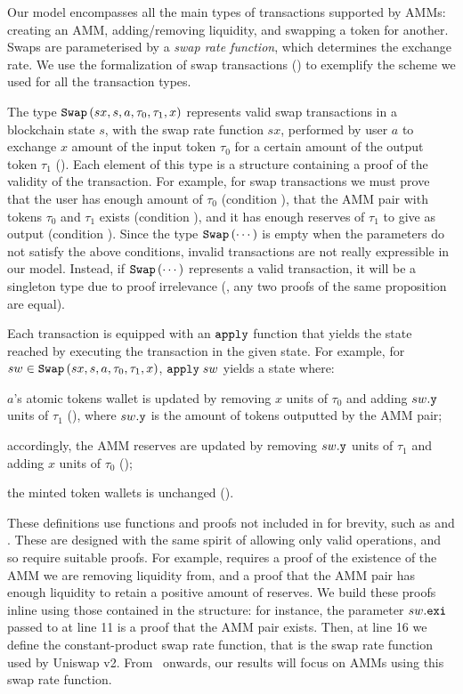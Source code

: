 Our model encompasses all the main types of transactions supported by AMMs: creating an AMM, adding/removing liquidity, and swapping a token for another. 
Swaps are parameterised by a \emph{swap rate function}, which determines the  exchange rate.
We use the formalization of swap transactions () to exemplify the scheme we used for all the transaction types. 

The type $\code{Swap}\left(sx, s, a, \tau_0, \tau_1, x\right)$ represents valid swap transactions in a blockchain state $s$, with the swap rate function $sx$, performed by user $a$ to exchange $x$ amount of the input token $\tau_0$ for a certain amount of the output token $\tau_1$ (). 
Each element of this type is a structure containing a proof of the validity of the transaction. 
For example, for swap transactions we must prove that the user has enough amount of $\tau_0$ (condition ), 
that the AMM pair with tokens $\tau_0$ and $\tau_1$ exists 
(condition ), 
and it has enough reserves of $\tau_1$ to give as output 
(condition ). 
%
Since the type $\code{Swap}\left(\cdots\right)$
is empty when the parameters do not satisfy the above conditions,
invalid transactions are not really expressible in our model. 
%
Instead, if $\code{Swap}\left(\cdots\right)$ represents a valid transaction, it will be a singleton type due to proof irrelevance 
(\ie, any two proofs of the same proposition are equal). 

Each transaction is equipped with an $\code{apply}$ function that yields the state reached by executing the transaction in the given state. 
For example, for $sw \in \code{Swap}\left(sx, s, a, \tau_0, \tau_1, x\right)$, 
$\code{apply}\; sw$ yields a state where:
\begin{inlinelist}
\item $a$'s atomic tokens wallet is updated by removing $x$ units of $\tau_0$ and adding $sw\code{.y}$ units of $\tau_1$ (),
where $sw\code{.y}$ is the amount of tokens outputted by the AMM pair; 
\item accordingly, the AMM reserves are updated by removing $sw\code{.y}$ units of $\tau_1$ and adding $x$ units of $\tau_0$ (); 
\item the minted token wallets is unchanged ().
\end{inlinelist}
These definitions use functions and proofs 
not included in  for brevity, 
such as  and . 
These are designed with the same spirit of allowing only valid operations, and so require suitable proofs.
For example,  requires a proof of the existence of the AMM we are removing liquidity from, and a proof that the AMM pair has enough liquidity to retain a positive amount of reserves. 
We build these proofs inline using those contained in the structure:
for instance, the parameter $sw\code{.exi}$ passed to  
at line 11 is a proof that the AMM pair exists. 
Then, at line 16 we define the constant-product swap rate function, that is the swap rate function used by Uniswap v2. From~ onwards, our results will focus on AMMs using this swap rate function.

